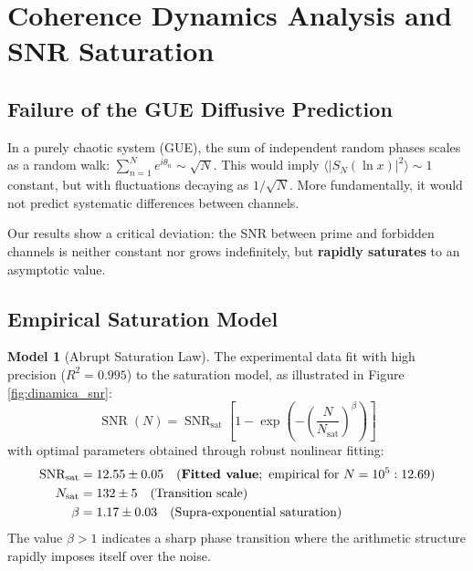 \documentclass[12pt, a4paper]{article}
\theoremstyle{plain}
\theoremstyle{definition}
\newtheorem{modelo}[teorema]{Model} %
\theoremstyle{remark}
\newcommand{\SNR}{\operatorname{SNR}}
\begin{document}
\section{Coherence Dynamics Analysis and SNR Saturation}
\label{sec:analisis}

\subsection{Failure of the GUE Diffusive Prediction}
\label{subsec:fallo_gue}

In a purely chaotic system (GUE), the sum of independent random phases scales as a random walk: $\sum_{n=1}^N e^{i\theta_n} \sim \sqrt{N}$. This would imply $\langle |S_N(\ln x)|^2 \rangle \sim 1$ constant, but with fluctuations decaying as $1/\sqrt{N}$. More fundamentally, it would not predict systematic differences between channels.

Our results show a critical deviation: the SNR between prime and forbidden channels is neither constant nor grows indefinitely, but \textbf{rapidly saturates} to an asymptotic value.

\subsection{Empirical Saturation Model}
\label{subsec:modelo_saturacion}

\begin{modelo}[Abrupt Saturation Law]
The experimental data fit with high precision ($R^2 = 0.995$) to the saturation model, as illustrated in Figure \ref{fig:dinamica_snr}:
\[
\SNR(N) = \SNR_{\text{sat}} \left[ 1 - \exp\left(-\left(\frac{N}{N_{\text{sat}}}\right)^\beta\right) \right]
\]
with optimal parameters obtained through robust nonlinear fitting:
\begin{align*}
\SNR_{\text{sat}} &= 12.55 \pm 0.05 \quad (\text{\textbf{Fitted value}}; \text{ empirical for } N=10^5: 12.69) \\
N_{\text{sat}} &= 132 \pm 5 \quad (\text{Transition scale}) \\
\beta &= 1.17 \pm 0.03 \quad (\text{Supra-exponential saturation})
\end{align*}
The value $\beta > 1$ indicates a sharp phase transition where the arithmetic structure rapidly imposes itself over the noise.
\end{modelo}
\end{document}
